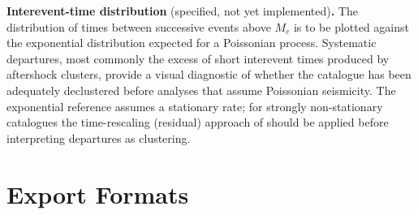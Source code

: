 \documentclass[12pt]{article}
\begin{document}
\textbf{Interevent-time distribution} (specified, not yet implemented)\textbf{.}
  The distribution of times between successive events above $M_c$ is to be
plotted against the exponential distribution expected for a Poissonian process.  Systematic departures, most commonly the
excess of short interevent times produced by aftershock clusters, provide a
visual diagnostic of whether the catalogue has been adequately declustered
before analyses that assume Poissonian seismicity.  The exponential reference
assumes a stationary rate; for strongly non-stationary catalogues the time-rescaling
(residual) approach of \citet{ogata1988} should be applied before interpreting
departures as clustering.

\section{Export Formats}
\label{sec:export}
\end{document}
